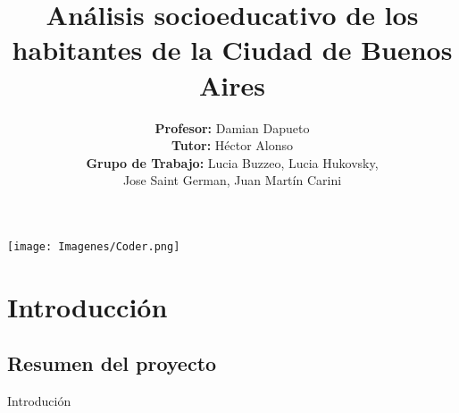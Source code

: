 \documentclass[pdf]{beamer}
\title[Curso Data Science]{\textbf{Análisis socioeducativo de los habitantes de la Ciudad de Buenos Aires}}
\author[Coderhouse]{\textbf{Profesor:} Damian Dapueto \\ \vspace{0.1cm} \textbf{Tutor:} Héctor Alonso \\ \vspace{0.1cm} \textbf{Grupo de Trabajo:} Lucia Buzzeo, Lucia Hukovsky,\\ Jose Saint German, Juan Martín Carini}
\date{}
\begin{document}
\begin{frame}

    \begin{center}
        \texttt{[image: Imagenes/Coder.png]}
    \end{center}

    \titlepage

\end{frame}

\section{Introducción}

    \subsection{Resumen del proyecto}

\begin{frame}{Introdución}
    
    

\end{frame}




\end{document}
